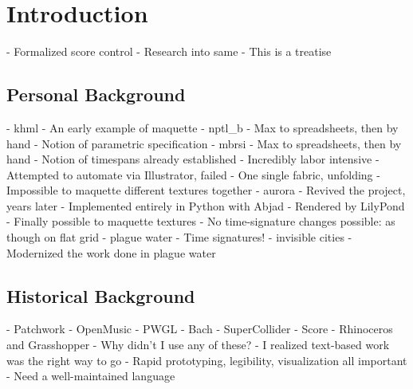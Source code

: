 \chapter{Introduction}
\label{chap:introduction}

\begin{markdown}
-   Formalized score control
-   Research into same
-   This is a treatise 
\end{markdown}

\section{Personal Background}

\begin{markdown}
-   khml
    -   An early example of maquette
-   nptl_b
    -   Max to spreadsheets, then by hand
    -   Notion of parametric specification 
-   mbrsi
    -   Max to spreadsheets, then by hand
    -   Notion of timespans already established
    -   Incredibly labor intensive
    -   Attempted to automate via Illustrator, failed
    -   One single fabric, unfolding
    -   Impossible to maquette different textures together
-   aurora
    -   Revived the project, years later
    -   Implemented entirely in Python with Abjad
    -   Rendered by LilyPond
    -   Finally possible to maquette textures
    -   No time-signature changes possible: as though on flat grid
-   plague water
    -   Time signatures!
-   invisible cities
    -   Modernized the work done in plague water
\end{markdown}

\section{Historical Background}

\begin{markdown}
-   Patchwork
-   OpenMusic
-   PWGL
-   Bach
-   SuperCollider
-   Score
-   Rhinoceros and Grasshopper
-   Why didn't I use any of these?
    -   I realized text-based work was the right way to go
    -   Rapid prototyping, legibility, visualization all important
    -   Need a well-maintained language
\end{markdown}

